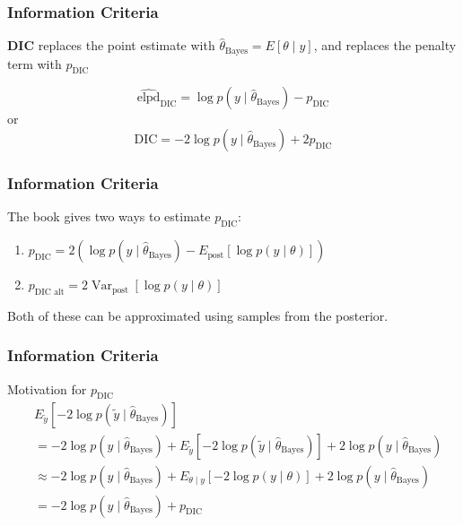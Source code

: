 \documentclass{beamer}
\begin{document}
\begin{frame}
\frametitle{Information Criteria}

{\bf DIC} replaces the point estimate with $\hat{\theta}_{\text{Bayes}} = E[\theta \mid y]$, and replaces the penalty term with $p_{\text{DIC}}$
\newline

\[
\widehat{\text{elpd}}_{\text{DIC}} = \log p(y \mid \hat{\theta}_{\text{Bayes}}) - p_{\text{DIC}}
\]
or
\[
\text{DIC} = -2\log p(y \mid \hat{\theta}_{\text{Bayes}}) +2 p_{\text{DIC}}
\]

\end{frame}

\begin{frame}
\frametitle{Information Criteria}

The book gives two ways to estimate $p_{\text{DIC}}$:

\begin{enumerate}
\item $p_{\text{DIC}} = 2\left(\log p(y \mid \hat{\theta}_{\text{Bayes}}) - E_{\text{post}}\left[ \log p(y \mid \theta) \right] \right)$
\item $p_{\text{DIC alt}} = 2 \operatorname{Var}_{\text{post}}\left[ \log p(y \mid \theta) \right]$
\end{enumerate}

Both of these can be approximated using samples from the posterior.

\end{frame}

\begin{frame}
\frametitle{Information Criteria}

Motivation for $p_{\text{DIC}}$
\begin{align*}
&E_{\tilde{y}}\left[-2  \log p(\tilde{y} \mid \hat{\theta}_{\text{Bayes}})  \right] \\
&= - 2\log p(y \mid \hat{\theta}_{\text{Bayes}}) + E_{\tilde{y}}\left[  -2\log p(\tilde{y} \mid \hat{\theta}_{\text{Bayes}})  \right] + 2\log p(y \mid \hat{\theta}_{\text{Bayes}})\\
&\approx - 2\log p(y \mid \hat{\theta}_{\text{Bayes}}) +  E_{\theta \mid y}\left[ - 2 \log p(y \mid \theta) \right] + 2 \log p(y \mid \hat{\theta}_{\text{Bayes}} ) \\
&= - 2\log p(y \mid \hat{\theta}_{\text{Bayes}}) + p_{\text{DIC}}
\end{align*}


\end{frame}
\end{document}
